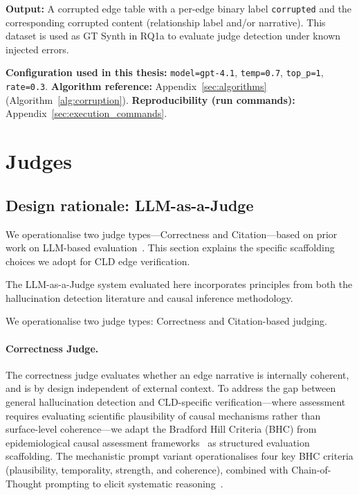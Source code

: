 \textbf{Output:} A corrupted edge table with a per-edge binary label \texttt{corrupted} and the corresponding corrupted content (relationship label and/or narrative). This dataset is used as GT Synth in RQ1a to evaluate judge detection under known injected errors.

\textbf{Configuration used in this thesis:} \texttt{model=gpt-4.1}, \texttt{temp=0.7}, \texttt{top\_p=1}, \texttt{rate=0.3}.
\textbf{Algorithm reference:} Appendix~\ref{sec:algorithms} (Algorithm~\ref{alg:corruption}). \textbf{Reproducibility (run commands):} Appendix~\ref{sec:execution_commands}.

\section{Judges}
\label{sec:judges}

\subsection{Design rationale: LLM-as-a-Judge}
We operationalise two judge types—Correctness and Citation—based on prior work on LLM-based evaluation~\citep{zheng2024judging}. This section explains the specific scaffolding choices we adopt for CLD edge verification.

The LLM-as-a-Judge system evaluated here incorporates principles from both the hallucination detection literature and causal inference methodology.

We operationalise two judge types: Correctness and Citation-based judging.

\paragraph{Correctness Judge.}
The correctness judge evaluates whether an edge narrative is internally coherent, and is by design independent of external context. To address the gap between general hallucination detection and CLD-specific verification---where assessment requires evaluating scientific plausibility of causal mechanisms rather than surface-level coherence---we adapt the Bradford Hill Criteria (BHC) from epidemiological causal assessment frameworks~\citep{shimonovich2020bradford} as structured evaluation scaffolding. The mechanistic prompt variant operationalises four key BHC criteria (plausibility, temporality, strength, and coherence), combined with Chain-of-Thought prompting to elicit systematic reasoning~\citep{wei2022chain, kojima2022large}.

